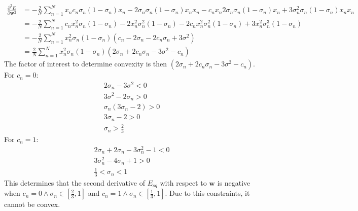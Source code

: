 \documentclass[fleqn]{report}
\renewcommand{\vec}[1]{\mathbf{#1}}
\begin{document}
\begin{equation}
    \begin{split}
        \frac{\partial^2E}{\partial \vec{w}^2} & =
        - \frac{2}{N} \sum_{n=1}^{N}
        x_n c_n \sigma_n (1 - \sigma_n) x_n - 2 \sigma_n \sigma_n (1 - \sigma_n) x_n x_n - c_n x_n 2 \sigma_n \sigma_n (1 - \sigma_n) x_n + 3 \sigma_n^2 \sigma_n (1 - \sigma_n) x_n x_n \\
        & = - \frac{2}{N} \sum_{n=1}^{N}
        c_n x_n^2 \sigma_n (1 - \sigma_n) - 2 x_n^2 \sigma_n^2 (1 - \sigma_n)
        - 2 c_n x_n^2 \sigma_n^2 (1 - \sigma_n) + 3 x_n^2 \sigma_n^3 (1 - \sigma_n) \\
        & = - \frac{2}{N} \sum_{n=1}^{N}
        x_n^2 \sigma_n (1 - \sigma_n) (c_n - 2 \sigma_n - 2 c_n \sigma_n + 3 \sigma^2) \\
        & = \frac{2}{N} \sum_{n=1}^{N}
        x_n^2 \sigma_n (1 - \sigma_n) (2 \sigma_n + 2 c_n \sigma_n - 3 \sigma^2 - c_n)
    \end{split}
\end{equation}
The factor of interest to determine convexity is then $(2 \sigma_n + 2 c_n \sigma_n - 3 \sigma^2 - c_n)$. For $c_n = 0$:
\begin{equation}
    \begin{split}
        2 \sigma_n - 3\sigma ^ 2 < 0 \\
        3\sigma ^ 2 - 2 \sigma_n > 0 \\
        \sigma_n (3 \sigma_n - 2) > 0 \\
        3 \sigma_n - 2 > 0 \\
        \sigma_n > \frac{2}{3}
    \end{split}
\end{equation}
For $c_n = 1$:
\begin{equation}
    \begin{split}
        2\sigma_n + 2\sigma_n - 3\sigma_n^2 - 1 < 0 \\
        3\sigma_n^2 - 4\sigma_n + 1 > 0 \\
        \frac{1}{3} < \sigma_n < 1
    \end{split}
\end{equation}
This determines that the second derivative of $E_{sq}$ with respect to $\vec{w}$ is negative when $c_n = 0 \land \sigma_n \in [\frac{2}{3}, 1]$ and $c_n = 1 \land \sigma_n \in [\frac{1}{3}, 1]$. Due to this constraints, it cannot be convex.
\end{document}
